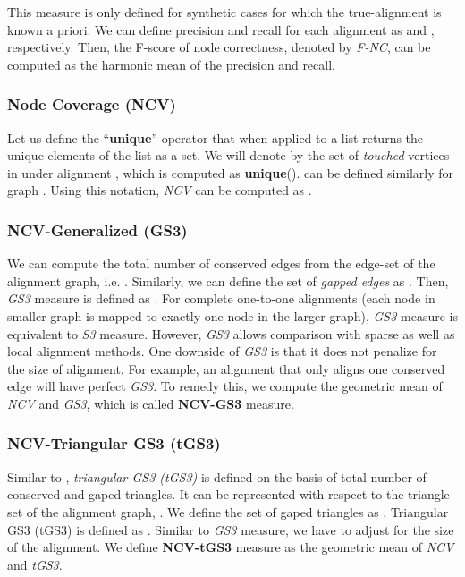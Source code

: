 \documentclass[10pt, journal, compsoc, final]{IEEEtran}
\begin{document}
This measure is only defined for synthetic cases for which the true-alignment is known a priori. We can define precision and recall for each alignment as  and , respectively. Then, the F-score of node correctness, denoted by \textit{F-NC}, can be computed as the harmonic mean of the precision and recall.


\subsubsection{Node Coverage (NCV)}
Let us define the ``\textbf{unique}'' operator that when applied to a list returns the unique elements of the list as a set. We will denote by  the set of \textit{touched} vertices in  under alignment , which is computed as \textbf{unique}().  can be defined similarly for graph . Using this notation, \textit{NCV} can be computed as .


\subsubsection{NCV-Generalized  (GS3)} 
We can compute the total number of conserved edges from 
the edge-set of the alignment graph, i.e. . Similarly, we can define the set of \textit{gapped edges} as . Then, \textit{GS3} measure is defined as . For complete one-to-one alignments (each node in smaller graph is mapped to exactly one node in the larger graph), \textit{GS3} measure is equivalent to \textit{S3} measure. However, \textit{GS3} allows comparison with sparse as well as local alignment methods. One downside of \textit{GS3} is that it does not penalize for the size of alignment. For example, an alignment that only aligns one conserved edge will have perfect \textit{GS3}. To remedy this, we compute the geometric mean of \textit{NCV} and \textit{GS3}, which is called \textbf{NCV-GS3} measure.

\subsubsection{NCV-Triangular GS3 (tGS3)}
Similar to , \textit{triangular GS3 (tGS3)} is defined on the basis of total number of 
conserved and gaped triangles. It can be represented with respect to the triangle-set of the alignment graph, 
. We  define the set of gaped triangles as . Triangular GS3 (tGS3) is defined as . Similar to \textit{GS3} measure, we have to adjust for the size of the alignment. We define \textbf{NCV-tGS3} measure as the geometric mean of \textit{NCV} and \textit{tGS3}.
\end{document}
